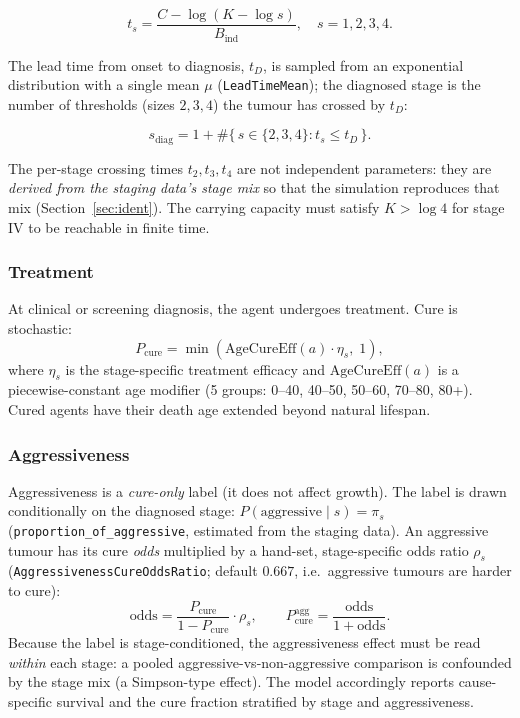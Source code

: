 \documentclass[12pt,a4paper]{article}
\begin{document}
\begin{equation}
    t_s = \frac{C - \log\left( K - \log s \right)}{B_{\text{ind}}}, \quad s = 1,2,3,4.
\end{equation}

The lead time from onset to diagnosis, $t_D$, is sampled from an exponential distribution with a single mean $\mu$ (\texttt{LeadTimeMean}); the diagnosed stage is the number of thresholds (sizes $2,3,4$) the tumour has crossed by $t_D$:

\begin{equation}
    s_{\text{diag}} = 1 + \#\{\, s \in \{2,3,4\} : t_s \le t_D \,\}.
\end{equation}

The per-stage crossing times $t_2, t_3, t_4$ are not independent parameters: they are \emph{derived from the staging data's stage mix} so that the simulation reproduces that mix (Section~\ref{sec:ident}). The carrying capacity must satisfy $K > \log 4$ for stage IV to be reachable in finite time.

\subsubsection{Treatment}

At clinical or screening diagnosis, the agent undergoes treatment. Cure is stochastic:
\begin{equation}
    P_{\text{cure}} = \min\left( \text{AgeCureEff}(a) \cdot \eta_s,\; 1 \right),
\end{equation}
where $\eta_s$ is the stage-specific treatment efficacy and $\text{AgeCureEff}(a)$ is a piecewise-constant age modifier (5 groups: 0--40, 40--50, 50--60, 70--80, 80+). Cured agents have their death age extended beyond natural lifespan.

\subsubsection{Aggressiveness}

Aggressiveness is a \emph{cure-only} label (it does not affect growth). The label is drawn conditionally on the diagnosed stage: $P(\text{aggressive} \mid s) = \pi_s$ (\texttt{proportion\_of\_aggressive}, estimated from the staging data). An aggressive tumour has its cure \emph{odds} multiplied by a hand-set, stage-specific odds ratio $\rho_s$ (\texttt{AggressivenessCureOddsRatio}; default $0.667$, i.e.\ aggressive tumours are harder to cure):
\begin{equation}
    \text{odds} = \frac{P_{\text{cure}}}{1 - P_{\text{cure}}} \cdot \rho_s, \qquad
    P_{\text{cure}}^{\text{agg}} = \frac{\text{odds}}{1 + \text{odds}}.
\end{equation}
Because the label is stage-conditioned, the aggressiveness effect must be read \emph{within} each stage: a pooled aggressive-vs-non-aggressive comparison is confounded by the stage mix (a Simpson-type effect). The model accordingly reports cause-specific survival and the cure fraction stratified by stage and aggressiveness.
\end{document}
